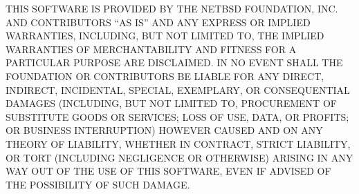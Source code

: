 \documentclass[twoside]{tceusermanual}
\begin{document}
   THIS SOFTWARE IS PROVIDED BY THE NETBSD FOUNDATION, INC. AND CONTRIBUTORS
   ``AS IS'' AND ANY EXPRESS OR IMPLIED WARRANTIES, INCLUDING, BUT NOT LIMITED
   TO, THE IMPLIED WARRANTIES OF MERCHANTABILITY AND FITNESS FOR A PARTICULAR
   PURPOSE ARE DISCLAIMED.  IN NO EVENT SHALL THE FOUNDATION OR CONTRIBUTORS
   BE LIABLE FOR ANY DIRECT, INDIRECT, INCIDENTAL, SPECIAL, EXEMPLARY, OR
   CONSEQUENTIAL DAMAGES (INCLUDING, BUT NOT LIMITED TO, PROCUREMENT OF
   SUBSTITUTE GOODS OR SERVICES; LOSS OF USE, DATA, OR PROFITS; OR BUSINESS
   INTERRUPTION) HOWEVER CAUSED AND ON ANY THEORY OF LIABILITY, WHETHER IN
   CONTRACT, STRICT LIABILITY, OR TORT (INCLUDING NEGLIGENCE OR OTHERWISE)
   ARISING IN ANY WAY OUT OF THE USE OF THIS SOFTWARE, EVEN IF ADVISED OF THE
   POSSIBILITY OF SUCH DAMAGE.


\cleardoublepage

\end{document}
